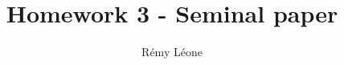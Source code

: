 \documentclass{sig-alternate}
\begin{document}
\title{Homework 3 - Seminal paper}


\author{
  \alignauthor
    Rémy Léone\\
    \\
}

\maketitle







\appendix
\makeatletter
\def\@seccntformat#1{Appendix~\csname the#1\endcsname:\quad}
\makeatother

%
\end{document}
